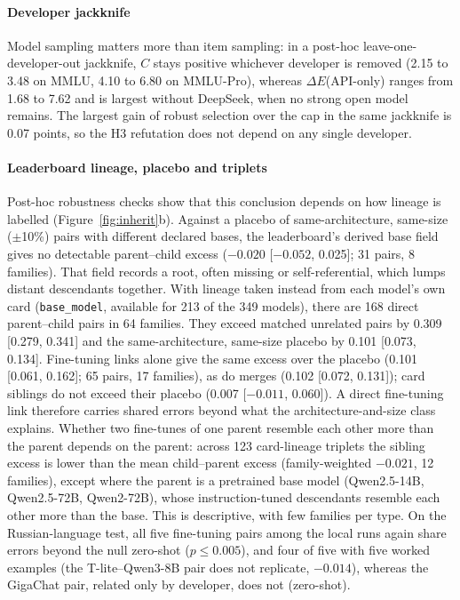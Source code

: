 \documentclass[preprint,12pt,authoryear]{elsarticle}
\newcommand{\dE}{\Delta E}
\begin{document}
\paragraph{Developer jackknife} Model sampling matters more than item sampling: in a post-hoc leave-one-developer-out jackknife, $C$ stays positive whichever developer is removed (2.15 to 3.48 on MMLU, 4.10 to 6.80 on MMLU-Pro), whereas $\dE$(API-only) ranges from 1.68 to 7.62 and is largest without DeepSeek, when no strong open model remains. The largest gain of robust selection over the cap in the same jackknife is 0.07 points, so the H3 refutation does not depend on any single developer.

\paragraph{Leaderboard lineage, placebo and triplets} Post-hoc robustness checks show that this conclusion depends on how lineage is labelled (Figure~\ref{fig:inherit}b). Against a placebo of same-architecture, same-size ($\pm$10\%) pairs with different declared bases, the leaderboard's derived base field gives no detectable parent--child excess ($-0.020$ [$-0.052$, 0.025]; 31 pairs, 8 families). That field records a root, often missing or self-referential, which lumps distant descendants together. With lineage taken instead from each model's own card (\texttt{base\_model}, available for 213 of the 349 models), there are 168 direct parent--child pairs in 64 families. They exceed matched unrelated pairs by 0.309 [0.279, 0.341] and the same-architecture, same-size placebo by 0.101 [0.073, 0.134]. Fine-tuning links alone give the same excess over the placebo (0.101 [0.061, 0.162]; 65 pairs, 17 families), as do merges (0.102 [0.072, 0.131]); card siblings do not exceed their placebo (0.007 [$-0.011$, 0.060]). A direct fine-tuning link therefore carries shared errors beyond what the architecture-and-size class explains. Whether two fine-tunes of one parent resemble each other more than the parent depends on the parent: across 123 card-lineage triplets the sibling excess is lower than the mean child--parent excess (family-weighted $-0.021$, 12 families), except where the parent is a pretrained base model (Qwen2.5-14B, Qwen2.5-72B, Qwen2-72B), whose instruction-tuned descendants resemble each other more than the base. This is descriptive, with few families per type. On the Russian-language test, all five fine-tuning pairs among the local runs again share errors beyond the null zero-shot ($p\le0.005$), and four of five with five worked examples (the T-lite--Qwen3-8B pair does not replicate, $-0.014$), whereas the GigaChat pair, related only by developer, does not (zero-shot).



\end{document}
